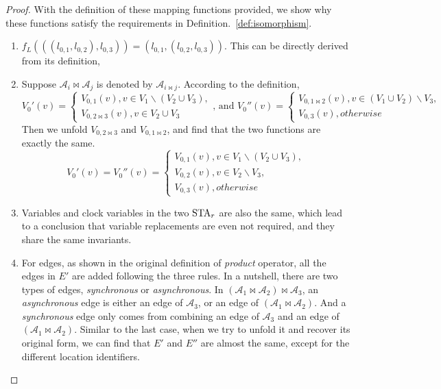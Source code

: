 \begin{proof}
With the definition of these mapping functions provided, we show why these functions satisfy the requirements in Definition.~\ref{def:isomorphism}.

\begin{enumerate}
    \item $f_L(((l_{0,1}, l_{0,2}), l_{0,3})) = (l_{0,1}, (l_{0,2}, l_{0,3}))$. This can be directly derived from its definition,
    \item Suppose $\mathscr{A}_i\bowtie\mathscr{A}_j$ is denoted by $\mathscr{A}_{i\bowtie j}$. According to the definition,
        \begin{displaymath}
            V_0'(v)=
            \left\{
                \begin{array}{lr}
                    V_{0,1}(v), v\in V_1\backslash(V_2\cup V_3), \\
                    V_{0,2\bowtie 3}(v), v\in V_2\cup V_3
                \end{array}
            \right.
            \mbox{, and }
            V_0''(v)=
            \left\{
                \begin{array}{lr}
                    V_{0,1\bowtie 2}(v), v\in (V_1\cup V_2)\backslash V_3, \\
                    V_{0,3}(v), otherwise
                \end{array}
            \right.
        \end{displaymath}
        Then we unfold $V_{0,2\bowtie 3}$ and $V_{0,1\bowtie 2}$, and find that the two functions are exactly the same.
        \begin{displaymath}
            V_0'(v)=
            V_0''(v)=
            \left\{
                \begin{array}{lr}
                    V_{0,1}(v), v\in V_1\backslash (V_2\cup V_3), \\
                    V_{0,2}(v), v\in V_2\backslash V_3, \\
                    V_{0,3}(v), otherwise
                \end{array}
            \right.
        \end{displaymath}
    \item Variables and clock variables in the two $\mbox{STA}_r$ are also the same, which lead to a conclusion that variable replacements are even not required, and they share the same invariants. 
    \item For edges, as shown in the original definition of \emph{product} operator, all the edges in $E'$ are added following the three rules. In a nutshell, there are two types of edges, \emph{synchronous} or \emph{asynchronous}. In $(\mathscr{A}_{1}\bowtie \mathscr{A}_{2})\bowtie \mathscr{A}_{3}$, an \emph{asynchronous} edge is either an edge of $\mathscr{A}_{3}$, or an edge of $(\mathscr{A}_{1}\bowtie \mathscr{A}_{2})$. And a \emph{synchronous} edge only comes from combining an edge of $\mathscr{A}_{3}$ and an edge of $(\mathscr{A}_{1}\bowtie \mathscr{A}_{2})$. Similar to the last case, when we try to unfold it and recover its original form, we can find that $E'$ and $E''$ are almost the same, except for the different location identifiers.
\end{enumerate}
\end{proof}

